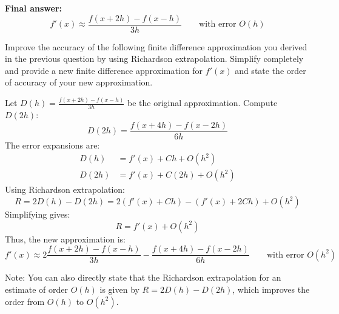 \documentclass[reqno, answers]{exam}
\begin{document}
\begin{questions}
\begin{solution}
    \textbf{Final answer:}
    \[
      \boxed{
        f'(x) \approx \frac{f(x+2h) - f(x-h)}{3h}
      }
      \qquad \text{with error } O(h)
    \]
  \end{solution}

  \newpage

  \question[8]
  Improve the accuracy of the following finite difference approximation you derived in the previous question by using Richardson extrapolation. Simplify completely and provide a new finite difference approximation for $f'(x)$ and state the order of accuracy of your new approximation.

  \begin{solution}
    Let $D(h) = \frac{f(x+2h) - f(x-h)}{3h}$ be the original approximation. Compute $D(2h)$:
    \[
      D(2h) = \frac{f(x+4h) - f(x-2h)}{6h}
    \]
    The error expansions are:
    \begin{align*}
      D(h) &= f'(x) + C h + O(h^2) \\
      D(2h) &= f'(x) + C (2h) + O(h^2)
    \end{align*}
    Using Richardson extrapolation:
    \[
      R = 2 D(h) - D(2h) = 2\left(f'(x) + C h\right) - \left(f'(x) + 2C h\right) + O(h^2)
    \]
    Simplifying gives:
    \[
      R = f'(x) + O(h^2)
    \]
    Thus, the new approximation is:
    \[
      \boxed{
        f'(x) \approx 2\frac{f(x+2h) - f(x-h)}{3h} - \frac{f(x+4h) - f(x-2h)}{6h}
      }
      \qquad \text{with error } O(h^2)
    \]

    Note: You can also directly state that the Richardson extrapolation for an estimate of order $O(h)$ is given by $R = 2 D(h) - D(2h)$, which improves the order from $O(h)$ to $O(h^2)$.
  \end{solution}


  \newpage


\end{questions}
\end{document}
